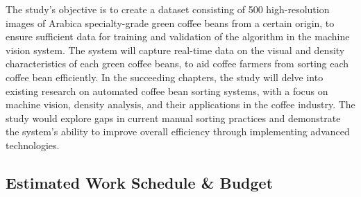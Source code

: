 The study’s objective is to create a dataset consisting of 500 high-resolution images of Arabica specialty-grade green coffee beans from a certain origin, to ensure sufficient data for training and validation of the algorithm in the machine vision system. The system will capture real-time data on the visual and density characteristics of each green coffee beans, to aid coffee farmers from sorting each coffee bean efficiently. In the succeeding chapters, the study will delve into existing research on automated coffee bean sorting systems, with a focus on machine vision, density analysis, and their applications in the coffee industry. The study would explore gaps in current manual sorting practices and demonstrate the system’s ability to improve overall efficiency through implementing advanced technologies.

\subsection{Estimated Work Schedule \& Budget}

